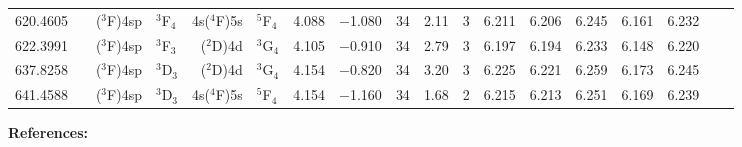 \documentclass[traditabstract]{aa}
\newcommand{\pst}{\phantom{*}}
\begin{document}
\begin{center}
\begin{mpsupertabular}{r@{}c@{\ \ \ }r@{~}l@{\ }r@{~}l@{\ \ \ }c@{\ \ \ }c@{\ \ \ }c@{\ \ \ }c@{\ \ \ }c@{\ \ \ }c@{\ \ \ }c@{\ \ \ }c@{\ \ \ }c@{\ \ \ }c@{\ \ \ }r@{\ \ \ }c}
620.4605 & &\footnotesize($^3$F)4sp  &\footnotesize$^3$F$_4$             &\footnotesize4s($^4$F)5s&\footnotesize$^5$F$_4$             & 4.088 & $-$1.080 & 34 & 2.11 & 3\pst      & 6.211 & 6.206 & 6.245 & 6.161 & 6.232 &             &   \\   
622.3991 & \color{BrickRed}{$^c$}	  	          	
           &\footnotesize($^3$F)4sp  &\footnotesize$^3$F$_3$             &\footnotesize($^2$D)4d  &\footnotesize$^3$G$_4$             & 4.105 & $-$0.910 & 34 & 2.79 & 3\pst      & 6.197 & 6.194 & 6.233 & 6.148 & 6.220 &             &   \\   
637.8258 & \color{BrickRed}{$^c$}								   	  	          	
           &\footnotesize($^3$F)4sp  &\footnotesize$^3$D$_3$             &\footnotesize($^2$D)4d  &\footnotesize$^3$G$_4$             & 4.154 & $-$0.820 & 34 & 3.20 & 3\pst      & 6.225 & 6.221 & 6.259 & 6.173 & 6.245 &             &   \\   
641.4588 & &\footnotesize($^3$F)4sp  &\footnotesize$^3$D$_3$             &\footnotesize4s($^4$F)5s&\footnotesize$^5$F$_4$             & 4.154 & $-$1.160 & 34 & 1.68 & 2\pst      & 6.215 & 6.213 & 6.251 & 6.169 & 6.239 &             &   \\  			       


\end{mpsupertabular}
\end{center}
\vspace{3mm}
\textbf{References:}\nopagebreak\\
\end{document}
